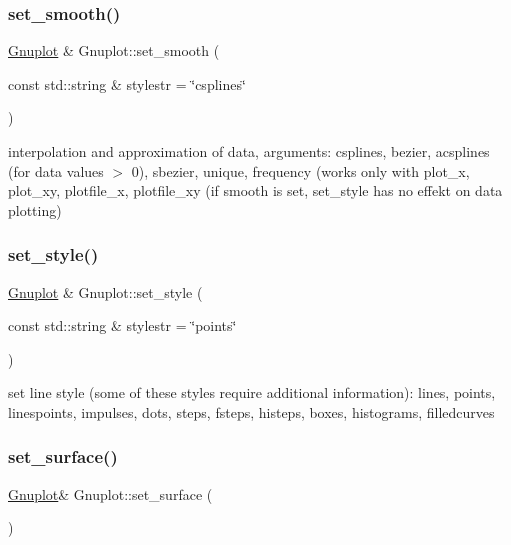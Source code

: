 \subsubsection{\texorpdfstring{set\+\_\+smooth()}{set\_smooth()}}
{\footnotesize\ttfamily \hyperlink{class_gnuplot}{Gnuplot} \& Gnuplot\+::set\+\_\+smooth (\begin{DoxyParamCaption}\item[{const std\+::string \&}]{stylestr = {\ttfamily \char`\"{}csplines\char`\"{}} }\end{DoxyParamCaption})}

interpolation and approximation of data, arguments\+: csplines, bezier, acsplines (for data values $>$ 0), sbezier, unique, frequency (works only with plot\+\_\+x, plot\+\_\+xy, plotfile\+\_\+x, plotfile\+\_\+xy (if smooth is set, set\+\_\+style has no effekt on data plotting) \mbox{\label{class_gnuplot_acfdcda292650775ebed4683e8e1515b5}} 
\subsubsection{\texorpdfstring{set\+\_\+style()}{set\_style()}}
{\footnotesize\ttfamily \hyperlink{class_gnuplot}{Gnuplot} \& Gnuplot\+::set\+\_\+style (\begin{DoxyParamCaption}\item[{const std\+::string \&}]{stylestr = {\ttfamily \char`\"{}points\char`\"{}} }\end{DoxyParamCaption})}

set line style (some of these styles require additional information)\+: lines, points, linespoints, impulses, dots, steps, fsteps, histeps, boxes, histograms, filledcurves \mbox{\label{class_gnuplot_a9825bd26500e30ca88404c4807e6607a}} 
\subsubsection{\texorpdfstring{set\+\_\+surface()}{set\_surface()}}
{\footnotesize\ttfamily \hyperlink{class_gnuplot}{Gnuplot}\& Gnuplot\+::set\+\_\+surface (\begin{DoxyParamCaption}{ }\end{DoxyParamCaption})\hspace{0.3cm}{\ttfamily [inline]}}

